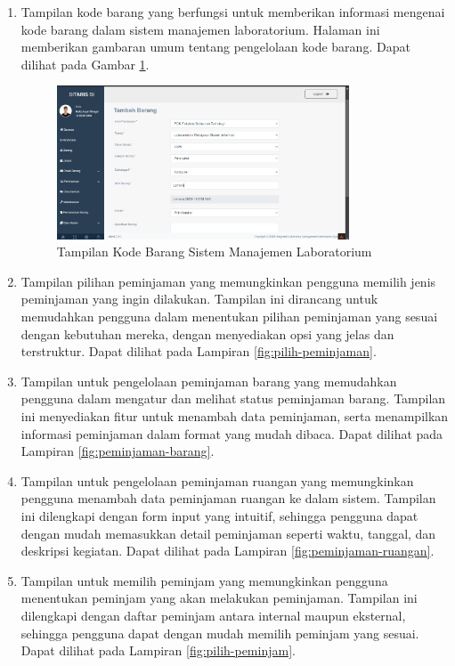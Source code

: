 \begin{enumerate}
	\item Tampilan kode barang yang berfungsi untuk memberikan informasi mengenai kode barang dalam sistem manajemen laboratorium. Halaman ini memberikan gambaran umum tentang pengelolaan kode barang. Dapat dilihat pada Gambar \ref{fig:kode-barang}.
	      \begin{figure}
		      \centering
		      \includegraphics[width=0.82\textwidth]{konten/gambar/perbaikan/kode-barang.png}
		      \caption{Tampilan Kode Barang Sistem Manajemen Laboratorium}
		      \label{fig:kode-barang}
	      \end{figure}

	\item Tampilan pilihan peminjaman yang memungkinkan pengguna memilih jenis peminjaman yang ingin dilakukan. Tampilan ini dirancang untuk memudahkan pengguna dalam menentukan pilihan peminjaman yang sesuai dengan kebutuhan mereka, dengan menyediakan opsi yang jelas dan terstruktur. Dapat dilihat pada Lampiran \ref{fig:pilih-peminjaman}.


	\item Tampilan untuk pengelolaan peminjaman barang yang memudahkan pengguna dalam mengatur dan melihat status peminjaman barang. Tampilan ini menyediakan fitur untuk menambah data peminjaman, serta menampilkan informasi peminjaman dalam format yang mudah dibaca. Dapat dilihat pada Lampiran \ref{fig:peminjaman-barang}.

	\item Tampilan untuk pengelolaan peminjaman ruangan yang memungkinkan pengguna menambah data peminjaman ruangan ke dalam sistem. Tampilan ini dilengkapi dengan form input yang intuitif, sehingga pengguna dapat dengan mudah memasukkan detail peminjaman seperti waktu, tanggal, dan deskripsi kegiatan. Dapat dilihat pada Lampiran \ref{fig:peminjaman-ruangan}.

	\item Tampilan untuk memilih peminjam yang memungkinkan pengguna menentukan peminjam yang akan melakukan peminjaman. Tampilan ini dilengkapi dengan daftar peminjam antara internal maupun eksternal, sehingga pengguna dapat dengan mudah memilih peminjam yang sesuai. Dapat dilihat pada Lampiran \ref{fig:pilih-peminjam}.

\end{enumerate}

